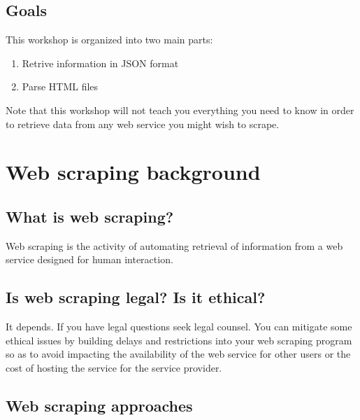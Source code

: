 \documentclass[
]{book}
\providecommand{\tightlist}{%
  \setlength{\itemsep}{0pt}\setlength{\parskip}{0pt}}
\begin{document}
\hypertarget{goals-4}{%
\subsection{Goals}\label{goals-4}}

\begin{alert}

This workshop is organized into two main parts:

\begin{enumerate}
\def\labelenumi{\arabic{enumi}.}
\tightlist
\item
  Retrive information in JSON format
\item
  Parse HTML files
\end{enumerate}

Note that this workshop will not teach you everything you need to know in order to retrieve data from any web service you might wish to scrape.

\end{alert}

\hypertarget{web-scraping-background}{%
\section{Web scraping background}\label{web-scraping-background}}

\hypertarget{what-is-web-scraping}{%
\subsection{What is web scraping?}\label{what-is-web-scraping}}

Web scraping is the activity of automating retrieval of information from a web service designed for human interaction.

\hypertarget{is-web-scraping-legal-is-it-ethical}{%
\subsection{Is web scraping legal? Is it ethical?}\label{is-web-scraping-legal-is-it-ethical}}

It depends. If you have legal questions seek legal counsel. You can mitigate some ethical issues by building delays and restrictions into your web scraping program so as to avoid impacting the availability of the web service for other users or the cost of hosting the service for the service provider.

\hypertarget{web-scraping-approaches}{%
\subsection{Web scraping approaches}\label{web-scraping-approaches}}
\end{document}
